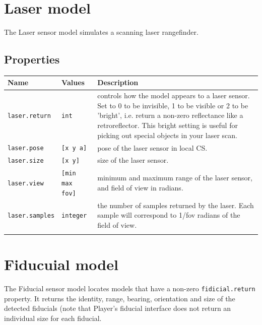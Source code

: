 \documentclass[letter,11pt,twoside]{report}
\begin{document}
\newpage
\section{Laser model}

The Laser sensor model simulates a scanning laser rangefinder.

\subsection*{Properties}
\begin{tabularx}{\columnwidth}{llX}
\hline
Name & Values & Description \\
\hline

\verb'laser.return' & \verb'int' & controls how the model appears to a
laser sensor. Set to 0 to be invisible, 1 to be visible or 2 to be
'bright', i.e. return a non-zero reflectance like a
retroreflector. This bright setting is useful for picking out special
objects in your laser scan.\\

\verb'laser.pose' & \verb'[x y a]' & pose of the laser sensor in local CS.\\

\verb'laser.size'  & \verb'[x y]' & size of the laser sensor. \\

\verb'laser.view' & \verb'[min max fov]' & minimum and maximum range
of the laser sensor, and field of view in radians. \\

\verb'laser.samples' & \verb'integer' & the number of samples returned
by the laser. Each sample will correspond to 1/fov radians of the
field of view.\\

\hline \\
\end{tabularx}


\newpage
\section{Fiducuial model}

The Fiducial sensor model locates models that have a non-zero
\verb'fidicial.return' property. It returns the identity, range,
bearing, orientation and size of the detected fiducials (note that
Player's fiducial interface does not return an individual size for
each fiducial.
\end{document}
